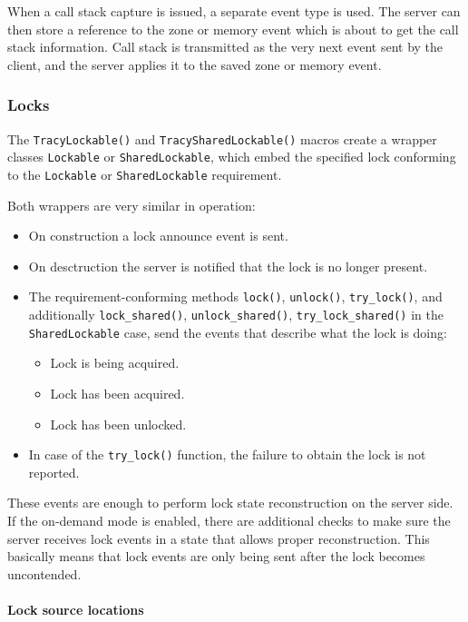 \documentclass[hidelinks,titlepage,a4paper]{article}
\begin{document}
When a call stack capture is issued, a separate event type is used. The server can then store a reference to the zone or memory event which is about to get the call stack information. Call stack is transmitted as the very next event sent by the client, and the server applies it to the saved zone or memory event.

\subsubsection{Locks}

The \texttt{TracyLockable()} and \texttt{TracySharedLockable()} macros create a wrapper classes \texttt{Lockable} or \texttt{SharedLockable}, which embed the specified lock conforming to the \texttt{Lockable} or \texttt{SharedLockable} requirement.

Both wrappers are very similar in operation:

\begin{itemize}
\item On construction a lock announce event is sent.
\item On desctruction the server is notified that the lock is no longer present.
\item The requirement-conforming methods \texttt{lock()}, \texttt{unlock()}, \texttt{try\_lock()}, and additionally \texttt{lock\_shared()}, \texttt{unlock\_shared()}, \texttt{try\_lock\_shared()} in the \texttt{SharedLockable} case, send the events that describe what the lock is doing:
\begin{itemize}
\item Lock is being acquired.
\item Lock has been acquired.
\item Lock has been unlocked.
\end{itemize}
\item In case of the \texttt{try\_lock()} function, the failure to obtain the lock is not reported.
\end{itemize}

These events are enough to perform lock state reconstruction on the server side. If the on-demand mode is enabled, there are additional checks to make sure the server receives lock events in a state that allows proper reconstruction. This basically means that lock events are only being sent after the lock becomes uncontended.

\paragraph{Lock source locations}
\end{document}
